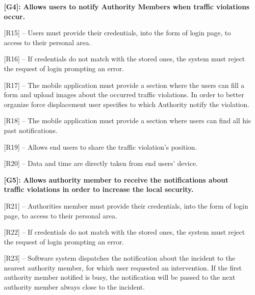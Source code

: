 \documentclass[12pt]{article}
\begin{document}
\begin{flushleft}
\vspace{4mm}
\textbf{[G4]: Allows users to notify Authority Members when traffic violations occur.}
\vspace{2mm}

[R15] -- Users must provide their credentials, into the form of login page, to access to their personal area.
\vspace{2mm}

[R16] – If credentials do not match with the stored ones, the system must reject the request of login prompting an error.
\vspace{2mm}

[R17] – The mobile application must provide a section where the users can fill a form and upload images about the occurred traffic violations. In order to better organize force displacement user specifies to which Authority notify the violation.
\vspace{2mm}

[R18] –  The mobile application must provide a section where users can find all his past notifications.
\vspace{2mm}

[R19] – Allows end users to share the traffic violation’s position.
\vspace{2mm}

[R20] – Data and time are directly taken from end users’ device.
\vspace{2mm}

\vspace{4mm}
\textbf{[G5]: Allows authority member to receive the notifications about traffic violations in order to increase the local security.}
\vspace{2mm}

[R21] -- Authorities member must provide their credentials, into the form of login page, to access to their personal area.
\vspace{2mm}

[R22] – If credentials do not match with the stored ones, the system must reject the request of login prompting an error.
\vspace{2mm}

[R23] – Software system dispatches the notification about the incident to the nearest authority member, for which user requested an intervention. If the first authority member notified is busy, the notification will be passed to the next authority member always close to the incident.
\vspace{2mm}


\end{flushleft}
\end{document}

